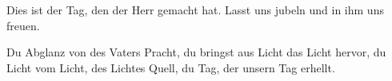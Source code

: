 \medskip

\resp


\medskip

\begin{sloppypar}
{\noindent\rm{ Dies ist der Tag, den der Herr gemacht hat. Lasst uns jubeln und in ihm uns freuen.}}
\end{sloppypar}

\newpage


\def\greinitialformat#1{{\fontsize{40}{40}\selectfont #1}}
\gresetfirstlineaboveinitial{\small \textcolor{red}{hieme}}{}
\setaboveinitialseparation{0.72mm}


\medskip

\begin{sloppypar}
{\noindent\rm{ Du Abglanz von des Vaters Pracht,
du bringst aus Licht das Licht hervor,
du Licht vom Licht, des Lichtes Quell, du Tag, der unsern Tag erhellt.}}
\end{sloppypar}

\medskip

